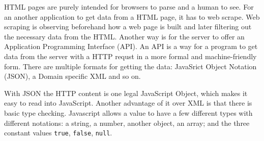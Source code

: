 HTML pages are purely intended for browsers to parse and a human to see. For an
another application to get data from a HTML page, it has to web scrape. Web
scraping is observing beforehand how a web page is built and later filtering out
the necessary data from the HTML. Another way is for the server to offer an
Application Programming Interface (API). An API is a way for a program to get
data from the server with a HTTP requst in a more formal and machine-friendly
form. There are multiple formats for getting the data: JavaSrict Object Notation
(JSON), a Domain specific XML and so on.

With JSON the HTTP content is one legal JavaScript Object, which makes it easy
to read into JavaScript. Another advantage of it over XML is that there is basic
type checking. Javascript allows a value to have a few different types with
different notations: a string, a number, another object, an array; and the three
constant values \verb;true;, \verb;false;,
\verb;null;.\cite{website:json-guide,website:json}
